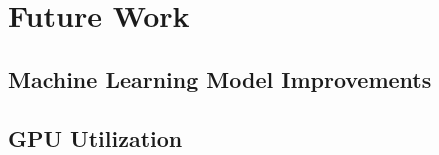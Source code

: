 \chapter{Future Work}
\label{chap:future}

\section{Machine Learning Model Improvements}
\label{sec:futuresec1}

\section{GPU Utilization}
\label{sec:futuresec2}